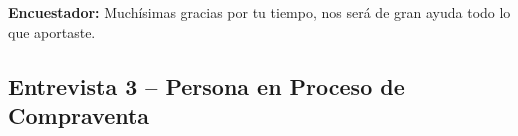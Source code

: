 \textbf{Encuestador:} Muchísimas gracias por tu tiempo, nos será de gran ayuda todo lo que aportaste.

\subsection{Entrevista 3 -- Persona en Proceso de Compraventa}

